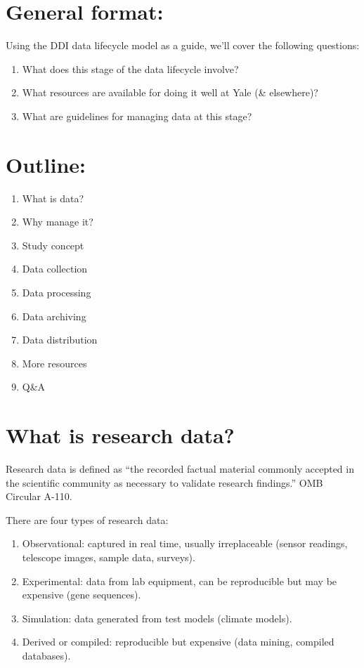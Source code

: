 \documentclass[]{article}
\begin{document}
\section{General format:}\label{general-format}

Using the DDI data lifecycle model as a guide, we'll cover the following
questions:

\begin{enumerate}
\def\labelenumi{\arabic{enumi}.}
\itemsep1pt\parskip0pt
\item
  What does this stage of the data lifecycle involve?
\item
  What resources are available for doing it well at Yale (\& elsewhere)?
\item
  What are guidelines for managing data at this stage?
\end{enumerate}

\section{Outline:}\label{outline}

\begin{enumerate}
\def\labelenumi{\arabic{enumi}.}
\itemsep1pt\parskip0pt
\item
  What is data?
\item
  Why manage it?
\item
  Study concept
\item
  Data collection
\item
  Data processing
\item
  Data archiving
\item
  Data distribution
\item
  More resources
\item
  Q\&A
\end{enumerate}

\section{What is research data?}\label{what-is-research-data}

Research data is defined as ``the recorded factual material commonly
accepted in the scientific community as necessary to validate research
findings.'' OMB Circular A-110.

There are four types of research data:

\begin{enumerate}
\def\labelenumi{\arabic{enumi}.}
\itemsep1pt\parskip0pt
\item
  Observational: captured in real time, usually irreplaceable (sensor
  readings, telescope images, sample data, surveys).
\item
  Experimental: data from lab equipment, can be reproducible but may be
  expensive (gene sequences).
\item
  Simulation: data generated from test models (climate models).
\item
  Derived or compiled: reproducible but expensive (data mining, compiled
  databases).
\end{enumerate}
\end{document}
